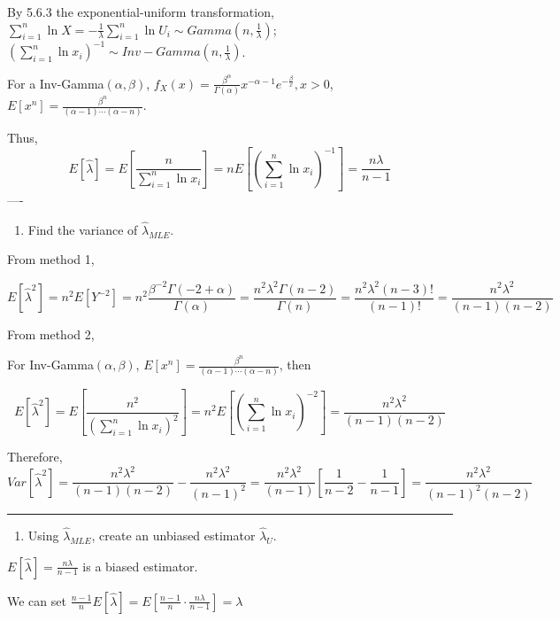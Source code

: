 \documentclass[12pt,]{article}
\providecommand{\tightlist}{%
  \setlength{\itemsep}{0pt}\setlength{\parskip}{0pt}}
\begin{document}
By 5.6.3 the exponential-uniform transformation,
\(\sum_{i=1}^n\ln X=-\frac1\lambda\sum_{i=1}^n\ln U_i\sim Gamma(n,\frac1\lambda)\);
\((\sum_{i=1}^n\ln x_i)^{-1}\sim Inv-Gamma(n,\frac1\lambda)\).

For a Inv-Gamma\((\alpha,\beta)\),
\(f_{X}(x)=\frac{\beta^{\alpha}}{\Gamma(\alpha)}x^{-\alpha-1}e^{-\frac\beta{x}},x>0\),
\(E[x^n]=\frac{\beta^n}{(\alpha-1)\cdots(\alpha-n)}\).

Thus,
\[E[\hat\lambda]=E\left[\frac{n}{\sum_{i=1}^n\ln x_i}\right]=nE\left[(\sum_{i=1}^n\ln x_i)^{-1}\right]=\frac{n\lambda}{n-1}\]
----

\begin{enumerate}
\def\labelenumi{\alph{enumi}.}
\setcounter{enumi}{2}
\tightlist
\item
  \textcolor[rgb]{0.7,0.7,0.7}{Find the variance of $\hat\lambda_{MLE}$.}
\end{enumerate}

From method 1,

\[E[\hat\lambda^2]=n^2E[Y^{-2}]=n^2\frac{\beta^{-2}\Gamma(-2+\alpha)}{\Gamma(\alpha)}=\frac{n^2\lambda^2\Gamma(n-2)}{\Gamma(n)}=\frac{n^2\lambda^2(n-3)!}{(n-1)!}=\frac{n^2\lambda^2}{(n-1)(n-2)}\]

From method 2,

For Inv-Gamma\((\alpha,\beta)\),
\(E[x^n]=\frac{\beta^n}{(\alpha-1)\cdots(\alpha-n)}\), then

\[E[\hat\lambda^2]=E\left[\frac{n^2}{(\sum_{i=1}^n\ln x_i)^2}\right]=n^2E\left[(\sum_{i=1}^n\ln x_i)^{-2}\right]=\frac{n^2\lambda^2}{(n-1)(n-2)}\]

Therefore,
\[Var[\hat\lambda^2]=\frac{n^2\lambda^2}{(n-1)(n-2)}-\frac{n^2\lambda^2}{(n-1)^2}=\frac{n^2\lambda^2}{(n-1)}[\frac1{n-2}-\frac1{n-1}]=\frac{n^2\lambda^2}{(n-1)^2(n-2)}\]

\begin{center}\rule{0.5\linewidth}{\linethickness}\end{center}

\begin{enumerate}
\def\labelenumi{\alph{enumi}.}
\setcounter{enumi}{3}
\tightlist
\item
  \textcolor[rgb]{0.7,0.7,0.7}{Using $\hat\lambda_{MLE}$, create an unbiased estimator $\hat\lambda_{U}$.}
\end{enumerate}

\(E[\hat\lambda]=\frac{n\lambda}{n-1}\) is a biased estimator.

We can set
\(\frac{n-1}{n}E[\hat\lambda]=E[\frac{n-1}{n}\cdot\frac{n\lambda}{n-1}]=\lambda\)
\end{document}
